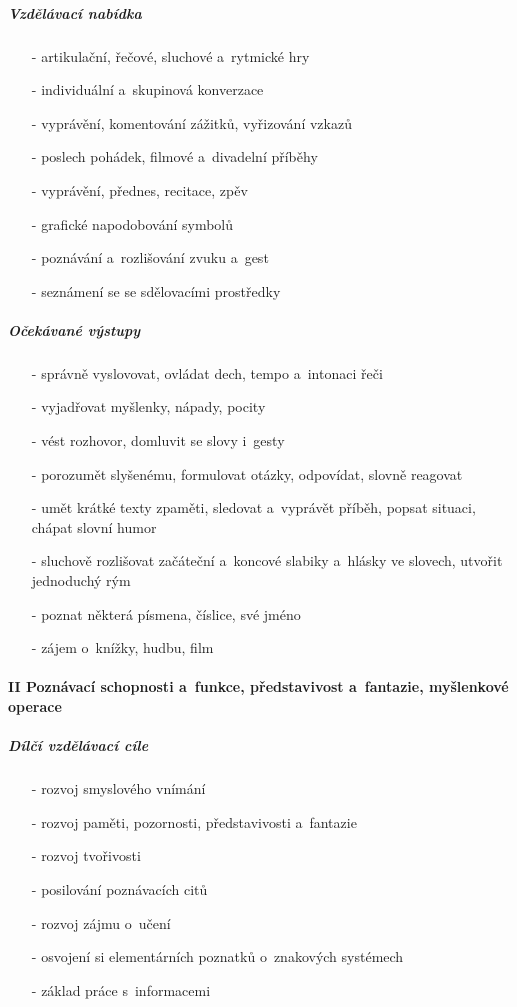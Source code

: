 					\subparagraph{Vzdělávací nabídka}

					\begin{itemize}
					\setlength\itemsep{-2mm}
						\item[-]artikulační, řečové, sluchové a~rytmické hry
						\item[-]individuální a~skupinová  konverzace
						\item[-]vyprávění, komentování zážitků, vyřizování vzkazů
						\item[-]poslech pohádek, filmové a~divadelní příběhy
						\item[-]vyprávění, přednes, recitace, zpěv
						\item[-]grafické napodobování symbolů
						\item[-]poznávání a~rozlišování zvuku a~gest
						\item[-]seznámení se se sdělovacími prostředky
					\end{itemize}

					\subparagraph{Očekávané výstupy}

					\begin{itemize}
					\setlength\itemsep{-2mm}
						\item[-]správně vyslovovat, ovládat dech, tempo a~intonaci řeči
						\item[-]vyjadřovat myšlenky, nápady, pocity
						\item[-]vést rozhovor, domluvit se slovy i~gesty
						\item[-]porozumět slyšenému, formulovat otázky, odpovídat, slovně reagovat
						\item[-]umět krátké texty zpaměti, sledovat a~vyprávět příběh, popsat situaci, chápat slovní humor
						\item[-]sluchově rozlišovat začáteční a~koncové slabiky a~hlásky ve slovech, utvořit jednoduchý rým
						\item[-]poznat některá písmena, číslice, své jméno
						\item[-]zájem o~knížky, hudbu, film
					\end{itemize}
				
				\paragraph{II Poznávací schopnosti a~funkce, představivost a~fantazie, myšlenkové operace}
				\textcolor{white}{ } 

					\subparagraph{Dílčí vzdělávací cíle}

					\begin{itemize}
					\setlength\itemsep{-2mm}
						\item[-]rozvoj smyslového vnímání
						\item[-]rozvoj paměti, pozornosti, představivosti a~fantazie
						\item[-]rozvoj tvořivosti
						\item[-]posilování poznávacích citů
						\item[-]rozvoj zájmu o~učení
						\item[-]osvojení si elementárních poznatků o~znakových systémech
						\item[-]základ práce s~informacemi
					\end{itemize}
					
